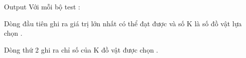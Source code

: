 Output
Với mỗi bộ test :


Dòng đầu tiên ghi ra giá trị lớn nhất có thể đạt được và số K là số đồ vật lựa chọn .


Dòng thứ 2 ghi ra chỉ số của K đồ vật được chọn .
